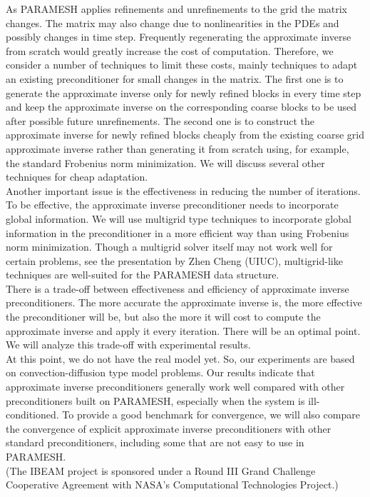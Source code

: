 \documentclass{report}
\begin{document}
As PARAMESH applies refinements and unrefinements to the grid the
matrix changes. The matrix may also change due to nonlinearities in
the PDEs and possibly changes in time step. Frequently regenerating the
approximate inverse from scratch would greatly increase the cost of
computation. Therefore, we consider a number of techniques to limit these costs,
mainly techniques to adapt an existing preconditioner for small changes in the
matrix. The first one is to generate the approximate
inverse only for newly refined blocks in every time step and keep
the approximate inverse on the corresponding coarse blocks to be used after
possible future unrefinements. The second one is to construct the approximate
inverse for newly refined blocks cheaply from the existing coarse grid
approximate inverse rather than generating it from scratch using, for example, the
standard Frobenius norm minimization. We will discuss several other techniques
for cheap adaptation.\\

Another important issue is the effectiveness in reducing the number of iterations.
To be effective, the approximate inverse preconditioner needs to incorporate global
information. We will use multigrid type techniques to incorporate global information
in the preconditioner in a more efficient way than using Frobenius norm minimization.
Though a multigrid solver itself may not work well for
certain problems, see the presentation by Zhen Cheng (UIUC), multigrid-like
techniques are well-suited for the PARAMESH data structure.\\

There is a trade-off between effectiveness and efficiency of
approximate inverse preconditioners. The more accurate the
approximate inverse is, the more effective the preconditioner will
be, but also the more it will cost to compute the approximate
inverse and apply it every iteration. There will be an optimal
point. We will analyze this trade-off with experimental
results.\\


At this point, we do not have the real model yet. So, our
experiments are based on convection-diffusion type model problems.
Our results indicate that approximate inverse preconditioners
generally work well compared with other preconditioners built on
PARAMESH, especially when the system is ill-conditioned. To
provide a good benchmark for convergence, we will also compare the
convergence of explicit approximate inverse preconditioners with
other standard
preconditioners, including some that are not easy to use in PARAMESH.\\


(The IBEAM project is sponsored under a Round III Grand Challenge
Cooperative Agreement with NASA's Computational Technologies
Project.)\\
\end{document}
